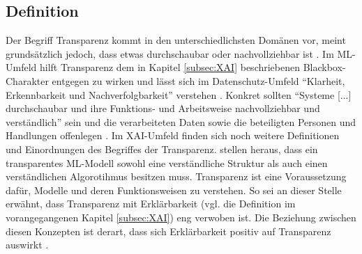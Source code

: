 \subsection{Definition}
\label{chap:Transparenz_Definition}
Der Begriff Transparenz kommt in den unterschiedlichsten Domänen vor, meint grundsätzlich jedoch, dass etwas durchschaubar oder nachvollziehbar ist \cite{DudenTransparenz}. Im ML-Umfeld hilft Transparenz dem in Kapitel \ref{subsec:XAI} beschriebenen Blackbox-Charakter entgegen zu wirken und lässt sich im Datenschutz-Umfeld \enquote{Klarheit, Erkennbarkeit und Nachverfolgbarkeit} verstehen \cite{bedner2010schutzziele, rudin2019stop}. Konkret sollten \enquote{Systeme [...] durchschaubar und ihre Funktions- und Arbeitsweise nachvollziehbar und verständlich} sein und die verarbeiteten Daten sowie die beteiligten Personen und Handlungen offenlegen \cite{bedner2010schutzziele}. Im XAI-Umfeld finden sich noch weitere Definitionen und Einordnungen des Begriffes der Transparenz. \cite{kamath2021explainable} stellen heraus, dass ein transparentes ML-Modell sowohl eine verständliche Struktur als auch einen verständlichen Algorotihmus besitzen muss. Transparenz ist eine Voraussetzung dafür, Modelle und deren Funktionsweisen zu verstehen. So sei an dieser Stelle erwähnt, dass Transparenz mit Erklärbarkeit (vgl. die Definition im vorangegangenen Kapitel \ref{subsec:XAI}) eng verwoben ist. Die Beziehung zwischen diesen Konzepten ist derart, dass sich Erklärbarkeit positiv auf Transparenz auswirkt \cite{kamath2021explainable}.